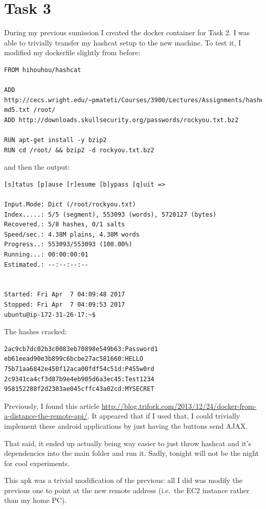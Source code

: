\documentclass{article}
\begin{document}
\section{Task 3}
During my previous sumission I created the docker container for Task 2. I was able to trivially transfer my hashcat setup to the new machine.
To test it, I modified my dockerfile slightly from before:


\begin{verbatim}
FROM hihouhou/hashcat

ADD http://cecs.wright.edu/~pmateti/Courses/3900/Lectures/Assignments/hashes-md5.txt /root/
ADD http://downloads.skullsecurity.org/passwords/rockyou.txt.bz2

RUN apt-get install -y bzip2
RUN cd /root/ && bzip2 -d rockyou.txt.bz2
\end{verbatim}

and then the output:
\begin{verbatim}
[s]tatus [p]ause [r]esume [b]ypass [q]uit =>

Input.Mode: Dict (/root/rockyou.txt)
Index.....: 5/5 (segment), 553093 (words), 5720127 (bytes)
Recovered.: 5/8 hashes, 0/1 salts
Speed/sec.: 4.38M plains, 4.38M words
Progress..: 553093/553093 (100.00%)
Running...: 00:00:00:01
Estimated.: --:--:--:--


Started: Fri Apr  7 04:09:48 2017
Stopped: Fri Apr  7 04:09:53 2017
ubuntu@ip-172-31-26-17:~$
\end{verbatim}

The hashes cracked:
\begin{verbatim}
2ac9cb7dc02b3c0083eb70898e549b63:Password1
eb61eead90e3b899c6bcbe27ac581660:HELLO
75b71aa6842e450f12aca00fdf54c51d:P455w0rd
2c9341ca4cf3d87b9e4eb905d6a3ec45:Test1234
958152288f2d2303ae045cffc43a02cd:MYSECRET
\end{verbatim}

Previously, I found this article \url{http://blog.trifork.com/2013/12/24/docker-from-a-distance-the-remote-api/}. It appeared that if I used that, I could trivially implement these android applications by just having the buttons send AJAX.

That said, it ended up actually being way easier to just throw hashcat and it's dependencies into the main folder and run it. Sadly, tonight will not be the night for cool experiments.

This apk was a trivial modification of the previous: all I did was modify the previous one to point at the new remote address (i.e.\ the EC2 instance rather than my home PC).
\end{document}
